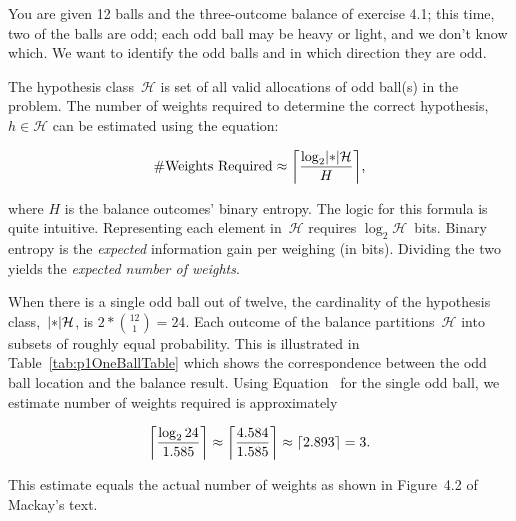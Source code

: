 \begin{problem}{4}{14}
  You are given 12 balls and the three-outcome balance of exercise 4.1; this time, two of the balls are odd; each odd ball may be heavy or light, and we don't know which.  We want to identify the odd balls and in which direction they are odd.
\end{problem}

  The hypothesis class~$\mathcal{H}$ is set of all valid allocations of odd ball(s) in the problem. The number of weights required to determine the correct hypothesis,~$h\in\mathcal{H}$ can be estimated using the equation:
  
  \begin{equation}\label{eq:p1NumbWeightsRequired}
    \#\text{Weights Required} \approx \ceil*{\frac{\log_{2} \abs*{\mathcal{H}}}{H}} \text{,}
  \end{equation}
  
  \noindent
  where $H$ is the balance outcomes' binary entropy.  The logic for this formula is quite intuitive. Representing each element in~$\mathcal{H}$ requires ${\log_{2}\mathcal{H}}$~bits.  Binary entropy is the \textit{expected} information gain per weighing (in bits).  Dividing the two yields the \textit{expected number of weights}.
  
  When there is a single odd ball out of twelve, the cardinality of the hypothesis class,~$\abs*{\mathcal{H}}$, is ${2 * \binom{12}{1} = 24}$. Each outcome of the balance partitions~$\mathcal{H}$ into subsets of roughly equal probability. This is illustrated in Table~\ref{tab:p1OneBallTable} which shows the correspondence between the odd ball location and the balance result. Using Equation~ for the single odd ball, we estimate number of weights required is approximately
  
  \[ \ceil*{\frac{\log_{2}24}{1.585}} \approx \ceil*{\frac{4.584}{1.585}} \approx \ceil{2.893} = 3 \text{.} \]
  
  \noindent
  This estimate equals the actual number of weights as shown in Figure~4.2 of Mackay's text.
  
